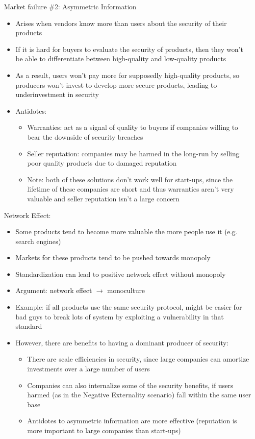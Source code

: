 Market failure \#2: Asymmetric Information
	\begin{itemize}
		\item Arises when vendors know more than users about the security of their products
		\item If it is hard for buyers to evaluate the security of products, then they won't be able to differentiate between high-quality and low-quality products
		\item As a result, users won't pay more for supposedly high-quality products, so producers won't invest to develop more secure products, leading to underinvestment in security
		\item Antidotes:
			\begin{itemize}
				\item Warranties: act as a signal of quality to buyers if companies willing to bear the downside of security breaches
				\item Seller reputation: companies may be harmed in the long-run by selling poor quality products due to damaged reputation
				\item Note: both of these solutions don't work well for start-ups, since the lifetime of these companies are short and thus warranties aren't very valuable and seller reputation isn't a large concern
			\end{itemize}
	\end{itemize}
	
Network Effect:
	\begin{itemize}
		\item Some products tend to become more valuable the more people use it (e.g. search engines)
		\item Markets for these products tend to be pushed towards monopoly
		\item Standardization can lead to positive network effect without monopoly
		\item Argument: network effect $\to$ monoculture
		\item Example: if all products use the same security protocol, might be easier for bad guys to break lots of system by exploiting a vulnerability in that standard
		\item However, there are benefits to having a dominant producer of security:
			\begin{itemize}
				\item There are scale efficiencies in security, since large companies can amortize investments over a large number of users
				\item Companies can also internalize some of the security benefits, if users harmed (as in the Negative Externality scenario) fall within the same user base
				\item Antidotes to asymmetric information are more effective (reputation is more important to large companies than start-ups)
			\end{itemize}
	\end{itemize}
	

